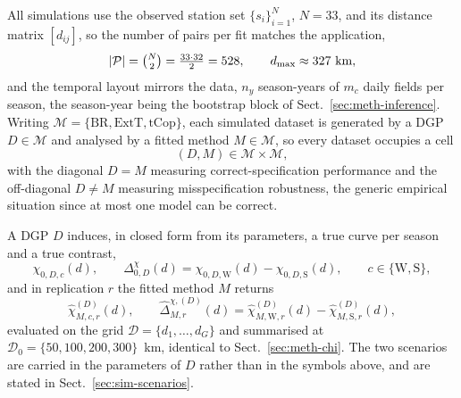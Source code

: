 All simulations use the observed station set \(\{s_i\}_{i=1}^N\), \(N=33\), and its distance matrix \([d_{ij}]\), so the number of pairs per fit matches the application,
\begin{equation}
  |\mathcal P|=\tbinom{N}{2}=\tfrac{33\cdot32}{2}=528,\qquad d_{\max}\approx327\ \text{km},
\end{equation}
and the temporal layout mirrors the data, \(n_y\) season-years of \(m_c\) daily fields per season, the season-year being the bootstrap block of Sect.~\ref{sec:meth-inference}. Writing \(\mathcal M=\{\mathrm{BR},\mathrm{ExtT},\mathrm{tCop}\}\), each simulated dataset is generated by a DGP \(D\in\mathcal M\) and analysed by a fitted method \(M\in\mathcal M\), so every dataset occupies a cell
\begin{equation}
  (D,M)\in\mathcal M\times\mathcal M,
\end{equation}
with the diagonal \(D=M\) measuring correct-specification performance and the off-diagonal \(D\ne M\) measuring misspecification robustness, the generic empirical situation since at most one model can be correct.

A DGP \(D\) induces, in closed form from its parameters, a true curve per season and a true contrast,
\begin{equation}
  \chi_{0,D,c}(d),
  \qquad
  \Delta_{0,D}^{\chi}(d)=\chi_{0,D,\mathrm W}(d)-\chi_{0,D,\mathrm S}(d),
  \qquad c\in\{\mathrm W,\mathrm S\},
\end{equation}
and in replication \(r\) the fitted method \(M\) returns
\begin{equation}
  \widehat\chi_{M,c,r}^{(D)}(d),
  \qquad
  \widehat\Delta_{M,r}^{\chi,(D)}(d)=\widehat\chi_{M,\mathrm W,r}^{(D)}(d)-\widehat\chi_{M,\mathrm S,r}^{(D)}(d),
\end{equation}
evaluated on the grid \(\mathcal D=\{d_1,\dots,d_G\}\) and summarised at \(\mathcal D_0=\{50,100,200,300\}\)~km, identical to Sect.~\ref{sec:meth-chi}. The two scenarios are carried in the parameters of \(D\) rather than in the symbols above, and are stated in Sect.~\ref{sec:sim-scenarios}.

